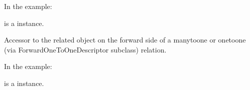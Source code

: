 \documentclass[letterpaper,10pt,spanish]{sphinxmanual}
\begin{document}
\begin{fulllineitems}
\begin{fulllineitems}
\sphinxAtStartPar
In the example:

\begin{sphinxVerbatim}[commandchars=\\\{\}]
 
       
\end{sphinxVerbatim}

\sphinxAtStartPar
{} is a  instance.

\end{fulllineitems}



\begin{fulllineitems}

\pysigstartsignatures
{}
\pysigstopsignatures
\end{fulllineitems}



\begin{fulllineitems}

\pysigstartsignatures
{}
\pysigstopsignatures
\sphinxAtStartPar
Accessor to the related object on the forward side of a many\sphinxhyphen{}to\sphinxhyphen{}one or
one\sphinxhyphen{}to\sphinxhyphen{}one (via ForwardOneToOneDescriptor subclass) relation.

\sphinxAtStartPar
In the example:

\begin{sphinxVerbatim}[commandchars=\\\{\}]
 
       
\end{sphinxVerbatim}

\sphinxAtStartPar
{} is a  instance.

\end{fulllineitems}



\begin{fulllineitems}


\end{fulllineitems}
\end{fulllineitems}
\end{document}
